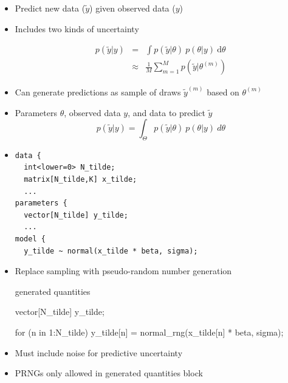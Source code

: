 \documentclass[10pt]{report}
\begin{document}
%
\begin{itemize}
\item Predict new data ($\tilde{y}$) given observed data ($y$)
\item Includes two kinds of uncertainty
\vspace*{-8pt}\begin{eqnarray*}
p(\tilde{y} |  y)
& = & \int p(\tilde{y} | \theta)
           \ p(\theta | y)
           \ \mathrm{d}\theta
\\[4pt]
& \approx & \frac{1}{M} \sum_{m=1}^M p(\tilde{y} | \theta^{(m)})
\end{eqnarray*}
\item Can generate predictions as sample of draws $\tilde{y}^{(m)}$
  based on $\theta^{(m)}$
\end{itemize}


%
\begin{itemize}
\item Parameters $\theta$, observed data $y$, and data to predict $\tilde{y}$
\[
p(\tilde{y}|y) = \int_{\Theta} p(\tilde{y}|\theta) \ p(\theta|y) \ d\theta
\]
\item
{\small
\begin{Verbatim}
data {
  int<lower=0> N_tilde;
  matrix[N_tilde,K] x_tilde;
  ...
parameters {
  vector[N_tilde] y_tilde;
  ...
model {
  y_tilde ~ normal(x_tilde * beta, sigma);
\end{Verbatim}
}
\end{itemize}


%
\begin{itemize}
\item Replace sampling with pseudo-random number generation
\begin{stancode}
   generated quantities {
     vector[N_tilde] y_tilde;

     for (n in 1:N_tilde)
       y_tilde[n] = normal_rng(x_tilde[n] * beta, sigma);
   }
\end{stancode}
\item Must include noise for predictive uncertainty
\item PRNGs only allowed in generated quantities block
\end{itemize}
\end{document}
